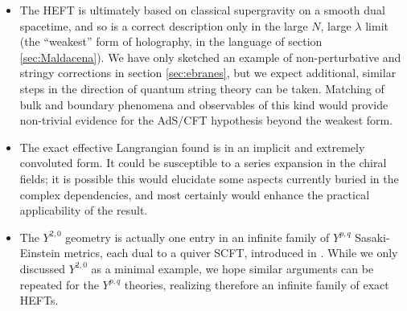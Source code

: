 \begin{itemize}
	\item The HEFT is ultimately based on classical supergravity on a smooth dual spacetime, and so is a correct description only in the large $N$, large $\lambda$ limit (the ``weakest'' form of holography, in the language of section \ref{sec:Maldacena}). We have only sketched an example of non-perturbative and stringy corrections in section \ref{sec:ebranes}, but we expect additional, similar steps in the direction of quantum string theory can be taken. Matching of bulk and boundary phenomena and observables of this kind would provide non-trivial evidence for the AdS/CFT hypothesis beyond the weakest form.
	\item The exact effective Langrangian found is in an implicit and extremely convoluted form. It could be susceptible to a series expansion in the chiral fields; it is possible this would elucidate some aspects currently buried in the complex dependencies, and most certainly would enhance the practical applicability of the result.
	\item The $Y^{2,0}$ geometry is actually one entry in an infinite family of $Y^{p,q}$ Sasaki-Einstein metrics, each dual to a quiver SCFT, introduced in \cite{benvenutiInfinite}. While we only discussed $Y^{2,0}$ as a minimal example, we hope similar arguments can be repeated for the $Y^{p,q}$ theories, realizing therefore an infinite family of exact HEFTs.
\end{itemize}
